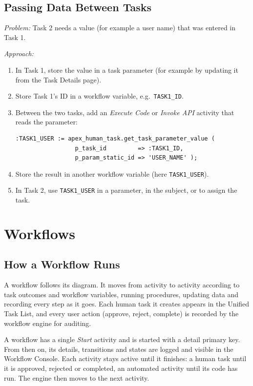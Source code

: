 \documentclass[11pt,a4paper]{article}
\begin{document}
\subsection{Passing Data Between Tasks}
\textit{Problem:} Task 2 needs a value (for example a user name) that was entered in Task 1.

\textit{Approach:}
\begin{enumerate}
\item In Task 1, store the value in a task parameter (for example by updating it from the Task Details page).
\item Store Task 1's ID in a workflow variable, e.g.\ \texttt{TASK1\_ID}.
\item Between the two tasks, add an \emph{Execute Code} or \emph{Invoke API} activity that reads the parameter:
\begin{lstlisting}
:TASK1_USER := apex_human_task.get_task_parameter_value (
                 p_task_id         => :TASK1_ID,
                 p_param_static_id => 'USER_NAME' );
\end{lstlisting}
\item Store the result in another workflow variable (here \texttt{TASK1\_USER}).
\item In Task 2, use \texttt{TASK1\_USER} in a parameter, in the subject, or to assign the task.
\end{enumerate}

\section{Workflows}
\subsection{How a Workflow Runs}
A workflow follows its diagram. It moves from activity to activity according to task outcomes and workflow variables, running procedures, updating data and recording every step as it goes. Each human task it creates appears in the Unified Task List, and every user action (approve, reject, complete) is recorded by the workflow engine for auditing.

A workflow has a single \emph{Start} activity and is started with a detail primary key. From then on, its details, transitions and states are logged and visible in the Workflow Console. Each activity stays active until it finishes: a human task until it is approved, rejected or completed, an automated activity until its code has run. The engine then moves to the next activity.
\end{document}
